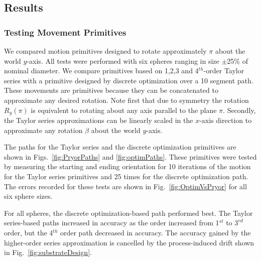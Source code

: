 \documentclass[letter paper, 10pt, conference]{ieeeconf}
\begin{document}
   

\subsection{Results}\label{subsec:Results}


\subsubsection{Testing Movement Primitives}
	
We compared motion primitives designed to rotate approximately $\pi$ about the world $y$-axis.  All tests were performed with six spheres ranging in size $\pm$25\% of nominal diameter.  We compare primitives based on 1,2,3 and 4$^{th}$-order Taylor series with a primitive designed by discrete optimization over a 10 segment path.  
     These movements are primitives because they can be concatenated to approximate any desired rotation.  Note first that due to symmetry the rotation $R_y(\pi)$ is equivalent to rotating about any axis parallel to the plane $\pi$.  Secondly, the Taylor series approximations can be linearly scaled in the $x$-axis direction to approximate any rotation $\beta$ about the world $y$-axis.
     
     The  paths for the Taylor series and the discrete optimization primitives are shown in Figs.~\ref{fig:PryorPaths} and \ref{fig:optimPaths}.  These primitives were tested by measuring the starting and ending orientation for 10 iterations of the motion for the Taylor series primitives and 25 times for the discrete optimization path.    The errors recorded for these tests are shown in Fig.~\ref{fig:OptimVsPryor} for all six sphere sizes.  %

For all spheres, the discrete optimization-based path performed best.  The Taylor series-based paths increased in accuracy as the order increased from 1$^{st}$ to $3^{rd}$ order, but  the 4$^{th}$ order path decreased in accuracy.    The accuracy gained by the higher-order series approximation is cancelled by the process-induced drift shown in Fig.~\ref{fig:substrateDesign}.
\end{document}

